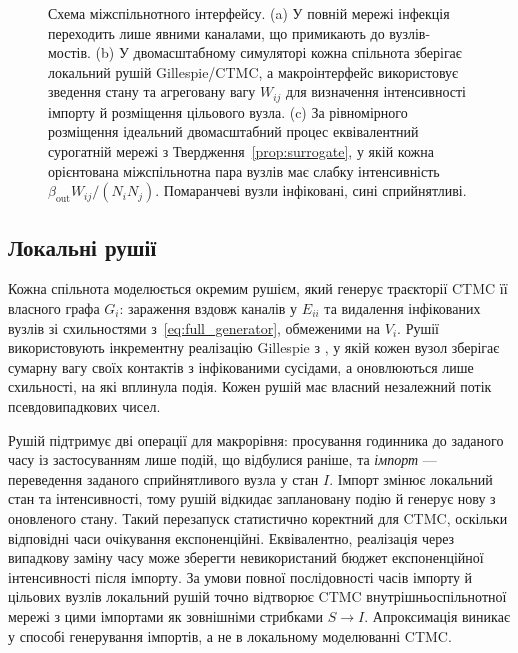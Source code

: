\begin{figure}[H]
\caption{Схема міжспільнотного інтерфейсу. (a) У повній мережі інфекція переходить лише явними каналами, що примикають до вузлів-мостів. (b) У двомасштабному симуляторі кожна спільнота зберігає локальний рушій Gillespie/CTMC, а макроінтерфейс використовує зведення стану та агреговану вагу $W_{ij}$ для визначення інтенсивності імпорту й розміщення цільового вузла. (c) За рівномірного розміщення ідеальний двомасштабний процес еквівалентний сурогатній мережі з Твердження~\ref{prop:surrogate}, у якій кожна орієнтована міжспільнотна пара вузлів має слабку інтенсивність $\beta_{\mathrm{out}}W_{ij}/(N_iN_j)$. Помаранчеві вузли інфіковані, сині сприйнятливі.}
\label{fig:schematic}
\end{figure}

\subsection{Локальні рушії}
\label{sec:local}

Кожна спільнота моделюється окремим рушієм, який генерує траєкторії CTMC її власного графа $G_i$: зараження вздовж каналів у $E_{ii}$ та видалення інфікованих вузлів зі схильностями з~\eqref{eq:full_generator}, обмеженими на $V_i$. Рушії використовують інкрементну реалізацію Gillespie з \citet{kuryliak2025simulating}, у якій кожен вузол зберігає сумарну вагу своїх контактів з інфікованими сусідами, а оновлюються лише схильності, на які вплинула подія. Кожен рушій має власний незалежний потік псевдовипадкових чисел.

Рушій підтримує дві операції для макрорівня: просування годинника до заданого часу із застосуванням лише подій, що відбулися раніше, та \emph{імпорт} --- переведення заданого сприйнятливого вузла у стан $I$. Імпорт змінює локальний стан та інтенсивності, тому рушій відкидає заплановану подію й генерує нову з оновленого стану. Такий перезапуск статистично коректний для CTMC, оскільки відповідні часи очікування експоненційні. Еквівалентно, реалізація через випадкову заміну часу може зберегти невикористаний бюджет експоненційної інтенсивності після імпорту. За умови повної послідовності часів імпорту й цільових вузлів локальний рушій точно відтворює CTMC внутрішньоспільнотної мережі з цими імпортами як зовнішніми стрибками $S\to I$. Апроксимація виникає у способі генерування імпортів, а не в локальному моделюванні CTMC.

